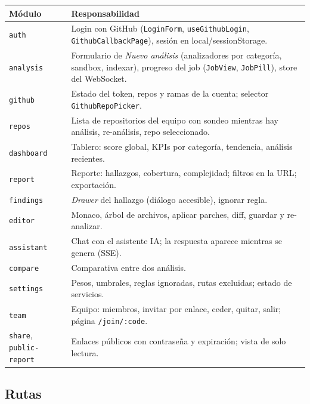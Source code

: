 \documentclass[11pt,a4paper]{article}
\newcommand{\code}[1]{\texttt{\small #1}}
\newcommand{\ruta}[1]{\texttt{\small\color{branddark}#1}}
\begin{document}
\begin{longtable}{@{}>{\raggedright\arraybackslash}p{2.6cm}>{\raggedright\arraybackslash}p{12.6cm}@{}}
\toprule
\textbf{Módulo} & \textbf{Responsabilidad} \\
\midrule
\endhead
\code{auth} & Login con GitHub (\code{LoginForm}, \code{useGithubLogin}, \code{GithubCallbackPage}), sesión en local/sessionStorage. \\
\code{analysis} & Formulario de \emph{Nuevo análisis} (analizadores por categoría, sandbox, indexar), progreso del job (\code{JobView}, \code{JobPill}), store del WebSocket. \\
\code{github} & Estado del token, repos y ramas de la cuenta; selector \code{GithubRepoPicker}. \\
\code{repos} & Lista de repositorios del equipo con sondeo mientras hay análisis, re-análisis, repo seleccionado. \\
\code{dashboard} & Tablero: score global, KPIs por categoría, tendencia, análisis recientes. \\
\code{report} & Reporte: hallazgos, cobertura, complejidad; filtros en la URL; exportación. \\
\code{findings} & \emph{Drawer} del hallazgo (diálogo accesible), ignorar regla. \\
\code{editor} & Monaco, árbol de archivos, aplicar parches, diff, guardar y re-analizar. \\
\code{assistant} & Chat con el asistente IA; la respuesta aparece mientras se genera (SSE). \\
\code{compare} & Comparativa entre dos análisis. \\
\code{settings} & Pesos, umbrales, reglas ignoradas, rutas excluidas; estado de servicios. \\
\code{team} & Equipo: miembros, invitar por enlace, ceder, quitar, salir; página \ruta{/join/:code}. \\
\code{share}, \code{public-report} & Enlaces públicos con contraseña y expiración; vista de solo lectura. \\
\bottomrule
\end{longtable}

\subsection{Rutas}
\end{document}
